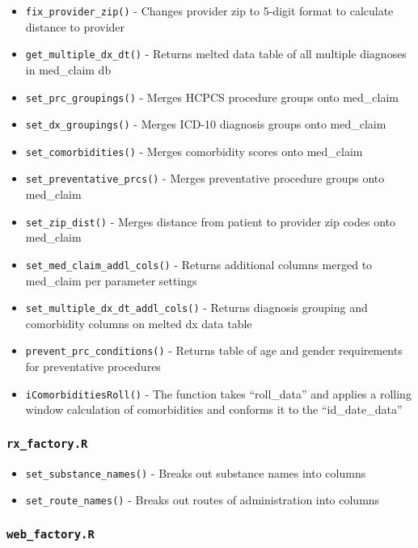 \documentclass[
]{book}
\providecommand{\tightlist}{%
  \setlength{\itemsep}{0pt}\setlength{\parskip}{0pt}}
\begin{document}
\begin{itemize}
\tightlist
\item
  \texttt{fix\_provider\_zip()} - Changes provider zip to 5-digit format to calculate distance to provider
\item
  \texttt{get\_multiple\_dx\_dt()} - Returns melted data table of all multiple diagnoses in med\_claim db
\item
  \texttt{set\_prc\_groupings()} - Merges HCPCS procedure groups onto med\_claim
\item
  \texttt{set\_dx\_groupings()} - Merges ICD-10 diagnosis groups onto med\_claim
\item
  \texttt{set\_comorbidities()} - Merges comorbidity scores onto med\_claim
\item
  \texttt{set\_preventative\_prcs()} - Merges preventative procedure groups onto med\_claim
\item
  \texttt{set\_zip\_dist()} - Merges distance from patient to provider zip codes onto med\_claim
\item
  \texttt{set\_med\_claim\_addl\_cols()} - Returns additional columns merged to med\_claim per parameter settings
\item
  \texttt{set\_multiple\_dx\_dt\_addl\_cols()} - Returns diagnosis grouping and comorbidity columns on melted dx data table
\item
  \texttt{prevent\_prc\_conditions()} - Returns table of age and gender requirements for preventative procedures
\item
  \texttt{iComorbiditiesRoll()} - The function takes ``roll\_data'' and applies a rolling window calculation of comorbidities and conforms it to the ``id\_date\_data''
\end{itemize}

\hypertarget{rx_factory.r}{%
\subsubsection{\texorpdfstring{\texttt{rx\_factory.R}}{rx\_factory.R}}\label{rx_factory.r}}

\begin{itemize}
\tightlist
\item
  \texttt{set\_substance\_names()} - Breaks out substance names into columns
\item
  \texttt{set\_route\_names()} - Breaks out routes of administration into columns
\end{itemize}

\hypertarget{web_factory.r}{%
\subsubsection{\texorpdfstring{\texttt{web\_factory.R}}{web\_factory.R}}\label{web_factory.r}}
\end{document}
